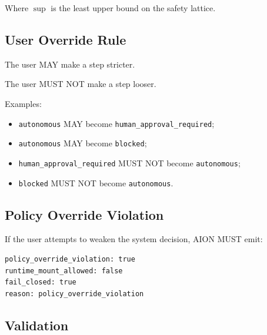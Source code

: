 Where $\sup$ is the least upper bound on the safety lattice.

\subsection{User Override Rule}

The user MAY make a step stricter.

The user MUST NOT make a step looser.

Examples:

\begin{itemize}
  \item \texttt{autonomous} MAY become \texttt{human\_approval\_required};
  \item \texttt{autonomous} MAY become \texttt{blocked};
  \item \texttt{human\_approval\_required} MUST NOT become \texttt{autonomous};
  \item \texttt{blocked} MUST NOT become \texttt{autonomous}.
\end{itemize}

\subsection{Policy Override Violation}

If the user attempts to weaken the system decision, AION MUST emit:

\begin{verbatim}
policy_override_violation: true
runtime_mount_allowed: false
fail_closed: true
reason: policy_override_violation
\end{verbatim}

\subsection{Validation}

